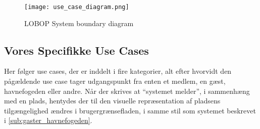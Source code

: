 \begin{figure}
  \centering
    \texttt{[image: use\_case\_diagram.png]}
  \caption{LOBOP System boundary diagram}
  \label{fig:usecase}
\end{figure}

\subsection{Vores Specifikke Use Cases}
Her følger use cases, der er inddelt i fire kategorier, alt efter hvorvidt den pågældende use case tager udgangspunkt fra enten et medlem, en gæst, havnefogeden eller andre. Når der skrives at \enquote{systemet melder}, i sammenhæng med en plads, hentydes der til den visuelle repræsentation af pladsens tilgængelighed ændres i brugergrænsefladen, i samme stil som systemet beskrevet i \cref{sub:gaster_havnefogeden}.

